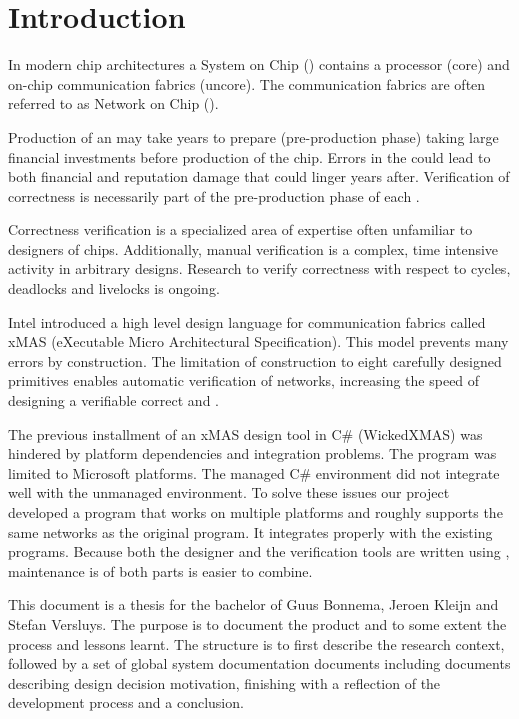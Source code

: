 \chapter*{Introduction}

In modern chip architectures a System on Chip (\Soc) contains a processor (core) and 
on-chip communication fabrics (uncore). The communication fabrics are often referred 
to as Network on Chip (\Noc).

Production of an \Noc may take years to prepare (pre-production phase) taking large financial investments
before production of the chip. Errors in the \Noc could lead to both financial and reputation 
damage that could linger years after. Verification of correctness is necessarily part of the 
pre-production phase of each \Noc.

Correctness verification is a specialized area of expertise often unfamiliar to designers of chips.
Additionally, manual verification is a complex, time intensive activity in arbitrary designs.
Research to verify correctness with respect to cycles, deadlocks and livelocks is ongoing. 

Intel introduced a high level design language for communication fabrics called xMAS (eXecutable 
Micro Architectural Specification). This model prevents many errors by 
construction\cite{DBLP:journals/dt/ChatterjeeKO12}. The limitation of construction to eight 
carefully designed primitives enables automatic verification of networks, increasing the 
speed of designing a verifiable correct \Noc and \Soc.

The previous installment of an xMAS design tool in C\# (WickedXMAS) was hindered by platform 
dependencies and \cpp integration problems. The program was limited to Microsoft platforms. The
managed C\# environment did not integrate well with the unmanaged \cpp environment.
To solve these issues our project developed a program that works on multiple platforms and 
roughly supports the same networks as the original program. It integrates properly with the existing \cpp 
programs. Because both the \xmas designer and the verification tools are written 
using \cpp, maintenance is of both parts is easier to combine.

This document is a thesis for the bachelor of Guus Bonnema, Jeroen Kleijn and Stefan Versluys.
The purpose is to document the product and to some extent the process and lessons learnt.
The structure is to first describe the research context, followed by a set of global system 
documentation documents including documents describing design decision motivation, finishing
with a reflection of the development process and a conclusion.
